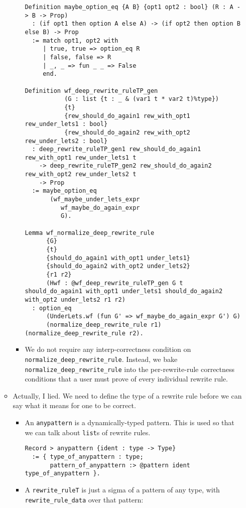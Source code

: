 \documentclass[
]{article}
\begin{document}
\begin{itemize}
\begin{itemize}
\begin{itemize}
\begin{verbatim}
Definition maybe_option_eq {A B} {opt1 opt2 : bool} (R : A -> B -> Prop)
  : (if opt1 then option A else A) -> (if opt2 then option B else B) -> Prop
  := match opt1, opt2 with
     | true, true => option_eq R
     | false, false => R
     | _, _ => fun _ _ => False
     end.

Definition wf_deep_rewrite_ruleTP_gen
           (G : list {t : _ & (var1 t * var2 t)%type})
           {t}
           {rew_should_do_again1 rew_with_opt1 rew_under_lets1 : bool}
           {rew_should_do_again2 rew_with_opt2 rew_under_lets2 : bool}
  : deep_rewrite_ruleTP_gen1 rew_should_do_again1 rew_with_opt1 rew_under_lets1 t
    -> deep_rewrite_ruleTP_gen2 rew_should_do_again2 rew_with_opt2 rew_under_lets2 t
    -> Prop
  := maybe_option_eq
       (wf_maybe_under_lets_expr
          wf_maybe_do_again_expr
          G).

Lemma wf_normalize_deep_rewrite_rule
      {G}
      {t}
      {should_do_again1 with_opt1 under_lets1}
      {should_do_again2 with_opt2 under_lets2}
      {r1 r2}
      (Hwf : @wf_deep_rewrite_ruleTP_gen G t should_do_again1 with_opt1 under_lets1 should_do_again2 with_opt2 under_lets2 r1 r2)
  : option_eq
      (UnderLets.wf (fun G' => wf_maybe_do_again_expr G') G)
      (normalize_deep_rewrite_rule r1) (normalize_deep_rewrite_rule r2).
\end{verbatim}
    \item
      We do not require any interp-correctness condition on
      \texttt{normalize\_deep\_rewrite\_rule}. Instead, we bake
      \texttt{normalize\_deep\_rewrite\_rule} into the per-rewrite-rule
      correctness conditions that a user must prove of every individual
      rewrite rule.
    \end{itemize}
  \item
    Actually, I lied. We need to define the type of a rewrite rule
    before we can say what it means for one to be correct.

    \begin{itemize}
    \item
      An \texttt{anypattern} is a dynamically-typed pattern. This is
      used so that we can talk about \texttt{list}s of rewrite rules.

\begin{verbatim}
Record > anypattern {ident : type -> Type}
  := { type_of_anypattern : type;
       pattern_of_anypattern :> @pattern ident type_of_anypattern }.
\end{verbatim}
    \item
      A \texttt{rewrite\_ruleT} is just a sigma of a pattern of any
      type, with \texttt{rewrite\_rule\_data} over that pattern:


\end{itemize}
\end{itemize}
\end{itemize}
\end{document}
